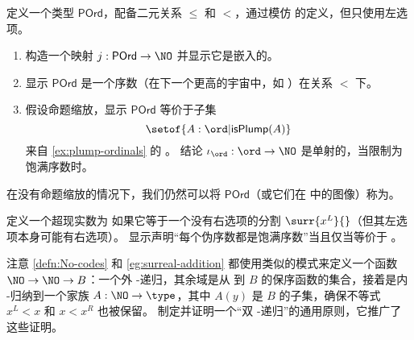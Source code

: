 \begin{ex}\label{ex:hiit-plump}
定义一个类型 $\mathsf{POrd}$，配备二元关系 $\le$ 和 $<$，通过模仿 \NO 的定义，但只使用左选项。
\begin{enumerate}
  \item 构造一个映射 $j:\mathsf{POrd} \to \NO$ 并显示它是嵌入的。
  \item 显示 $\mathsf{POrd}$ 是一个序数（在下一个更高的宇宙中，如 \ord）在关系 $<$ 下。
  \item 假设命题缩放，显示 $\mathsf{POrd}$ 等价于子集
  \[\setof{A:\ord | \mathsf{isPlump}(A)}\]
  来自 \cref{ex:plump-ordinals} 的 \ord。
  结论 $\iota_{\ord}:\ord\to\NO$ 是单射的，当限制为饱满序数时。
\end{enumerate}
在没有命题缩放的情况下，我们仍然可以将 $\mathsf{POrd}$（或它们在 \NO 中的图像）称为。
\end{ex}

\begin{ex}\label{ex:pseudo-ordinals}
定义一个超现实数为 如果它等于一个没有右选项的分割 $\surr{x^L}{}$（但其左选项本身可能有右选项）。
显示声明“每个伪序数都是饱满序数”当且仅当等价于 \LEM{}。
\end{ex}

\begin{ex}\label{ex:double-No-recursion}
注意 \cref{defn:No-codes} 和 \cref{eg:surreal-addition} 都使用类似的模式来定义一个函数 $\NO \to \NO \to B$：一个外 \NO-递归，其余域是从 \NO 到 $B$ 的保序函数的集合，接着是内 \NO-归纳到一个家族 $A:\NO\to\type$，其中 $A(y)$ 是 $B$ 的子集，确保不等式 $x^L<x$ 和 $x<x^R$ 也被保留。
制定并证明一个“双 \NO-递归”的通用原则，它推广了这些证明。
\end{ex}

%

